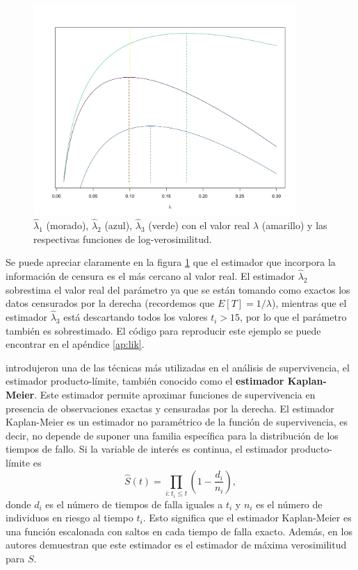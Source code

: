 \documentclass[11pt,a4paper]{article}
\begin{document}
\begin{figure}[htb]
\centering\includegraphics[width=10cm]{likelihood.png}
\caption{$\hat{\lambda}_1$ (morado), $\hat{\lambda}_2$ (azul), $\hat{\lambda}_3$ (verde) con el valor real $\lambda$ (amarillo) y las respectivas funciones de log-verosimilitud.}
\label{fig:lik}
\end{figure}

Se puede apreciar claramente en la figura \ref{fig:lik} que el estimador que incorpora la información de censura es el más cercano al valor real. El estimador $\hat{\lambda}_2$ sobrestima el valor real del parámetro ya que se están tomando como exactos los datos censurados por la derecha (recordemos que $E[T] = 1/\lambda$), mientras que el estimador $\hat{\lambda}_3$ está descartando todos los valores $t_i > 15$, por lo que el parámetro también es sobrestimado. El código para reproducir este ejemplo se puede encontrar en el apéndice \ref{ap:lik}.

\citet{kaplan-meier} introdujeron una de las técnicas más utilizadas en el análisis de supervivencia, el estimador producto-límite, también conocido como el \textbf{estimador Kaplan-Meier}. Este estimador permite aproximar funciones de supervivencia en presencia de observaciones exactas y censuradas por la derecha. El estimador Kaplan-Meier es un estimador no paramétrico de la función de supervivencia, es decir, no depende de suponer una familia específica para la distribución de los tiempos de fallo. Si la variable de interés es continua, el estimador producto-límite es
\begin{equation}
\label{eq:km}
\hat{S}(t) = \prod_{i: t_i \leq t} \left( 1-\frac{d_i}{n_i}\right),
\end{equation}
donde $d_i$ es el número de tiempos de falla iguales a $t_i$ y $n_i$ es el número de individuos en riesgo al tiempo $t_i$. Esto significa que el estimador Kaplan-Meier es una función escalonada con saltos en cada tiempo de falla exacto. Además, en \cite{kaplan-meier} los autores demuestran que este estimador es el estimador de máxima verosimilitud para $S$.
\end{document}
